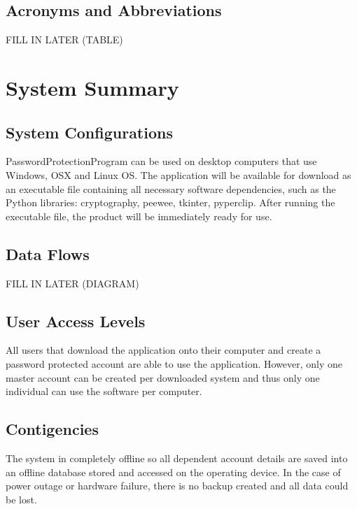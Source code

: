\documentclass[12pt, titlepage]{article}
\begin{document}
\subsection{Acronyms and Abbreviations} \label{AcrAbb}

FILL IN LATER (TABLE)


\section{System Summary} \label{SysSumm}


\subsection{System Configurations} \label{SysConf}

PasswordProtectionProgram can be used on desktop computers that use Windows, OSX and Linux OS. The application will be available for download as an executable file containing all necessary software dependencies, such as the Python libraries: cryptography, peewee, tkinter, pyperclip. After running the executable file, the product will be immediately ready for use.


\subsection{Data Flows} \label{DataFlow}

FILL IN LATER (DIAGRAM)


\subsection{User Access Levels} \label{UserAcc}

All users that download the application onto their computer and create a password protected account are able to use the application. However, only one master account can be created per downloaded system and thus only one individual can use the software per computer.


\subsection{Contigencies} \label{Contigs}

The system in completely offline so all dependent account details are saved into an offline database stored and accessed on the operating device. In the case of power outage or hardware failure, there is no backup created and all data could be lost.
\end{document}
